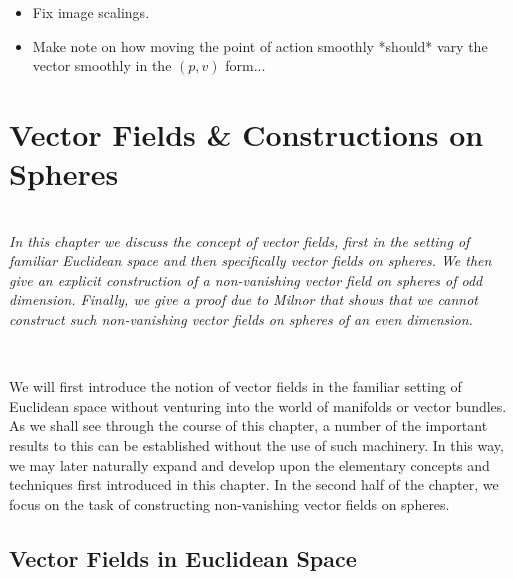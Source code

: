 \begin{itemize}
\item Fix image scalings.
\item Make note on how moving the point of action smoothly *should* vary the vector smoothly in the $(p,v)$ form...
\end{itemize}
\section{Vector Fields \& Constructions on Spheres}
\begin{center}
\small
\justify
{}\\
\textit{In this chapter we discuss the concept of vector fields, first in the setting of familiar Euclidean space and then specifically vector fields on spheres. We then give an explicit construction of a non-vanishing vector field on spheres of odd dimension. Finally, we give a proof due to Milnor that shows that we cannot construct such non-vanishing vector fields on spheres of an even dimension.}
\normalsize
\end{center}
\hfill\\

We will first introduce the notion of vector fields in the familiar setting of Euclidean space without venturing into the world of manifolds or vector bundles. As we shall see through the course of this chapter, a number of the important results  to this  can be established without the use of such machinery. In this way, we may later naturally expand and develop upon the elementary concepts and techniques first introduced in this chapter. In the second half of the chapter, we focus on the task of constructing non-vanishing vector fields on spheres.
%
\subsection{Vector Fields in Euclidean Space}


